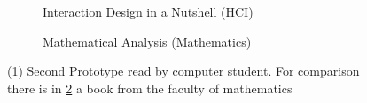 \begin{figure}[h]
  \centering
  \begin{subfigure}{0.48\textwidth}
    \centering
    \todo
    \caption{Interaction Design in a Nutshell (HCI)}
    \label{fig:meta_prototype2_hci}
  \end{subfigure}
  \hspace{0.1em}
  \begin{subfigure}{0.48\textwidth}
    \centering
    \todo
    \caption{Mathematical Analysis (Mathematics)}
    \label{fig:meta_prototype2_math}
  \end{subfigure}
  \caption[]{(\ref{fig:meta_prototype2_hci}) Second Prototype read by computer student. For comparison there is in \ref{fig:meta_prototype2_math} a book from the faculty of mathematics}
  \label{fig:meta_prototype2}
\end{figure}

